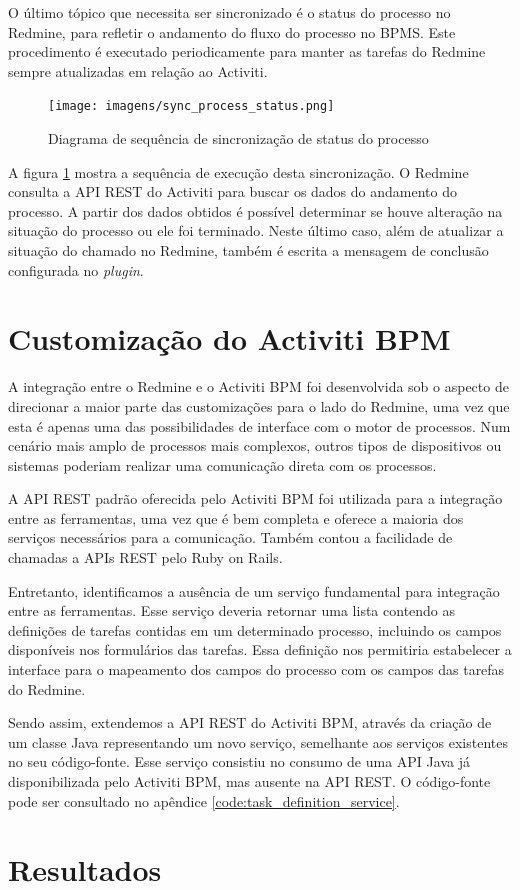 O último tópico que necessita ser sincronizado é o \textit{}{status} do processo no Redmine, para refletir o andamento do fluxo do processo no BPMS. Este procedimento é executado periodicamente para manter as tarefas do Redmine sempre atualizadas em relação ao Activiti.

\begin{figure}[H]
\centering
\texttt{[image: imagens/sync\_process\_status.png]}
\caption{Diagrama de sequência de sincronização de status do processo}
\label{fig:sync_process_status}
\end{figure}

A figura \ref{fig:sync_process_status} mostra a sequência de execução desta sincronização. O Redmine consulta a API REST do Activiti para buscar os dados do andamento do processo. A partir dos dados obtidos é possível determinar se houve alteração na situação do processo ou ele foi terminado. Neste último caso, além de atualizar a situação do chamado no Redmine, também é escrita a mensagem de conclusão configurada no \textit{plugin}.

\section{Customização do Activiti BPM}\label{sec:integracao_redmine_activiti-implementacao-activiti}

A integração entre o Redmine e o Activiti BPM foi desenvolvida sob o aspecto de direcionar a maior parte das customizações para o lado do Redmine, uma vez que esta é apenas uma das possibilidades de interface com o motor de processos. Num cenário mais amplo de processos mais complexos, outros tipos de dispositivos ou sistemas poderiam realizar uma comunicação direta com os processos.

A API REST padrão oferecida pelo Activiti BPM foi utilizada para a integração entre as ferramentas, uma vez que é bem completa e oferece a maioria dos serviços necessários para a comunicação. Também contou a facilidade de chamadas a APIs REST pelo Ruby on Rails. 

Entretanto, identificamos a ausência de um serviço fundamental para integração entre as ferramentas. Esse serviço deveria retornar uma lista contendo as definições de tarefas contidas em um determinado processo, incluindo os campos disponíveis nos formulários das tarefas. Essa definição nos permitiria estabelecer a interface para o mapeamento dos campos do processo com os campos das tarefas do Redmine.

Sendo assim, extendemos a API REST do Activiti BPM, através da criação de um classe Java representando um novo serviço, semelhante aos serviços existentes no seu código-fonte. Esse serviço consistiu no consumo de uma API Java já disponibilizada pelo Activiti BPM, mas ausente na API REST. O código-fonte pode ser consultado no apêndice \ref{code:task_definition_service}.

\section{Resultados}\label{sec:integracao_redmine_activiti-resultados}